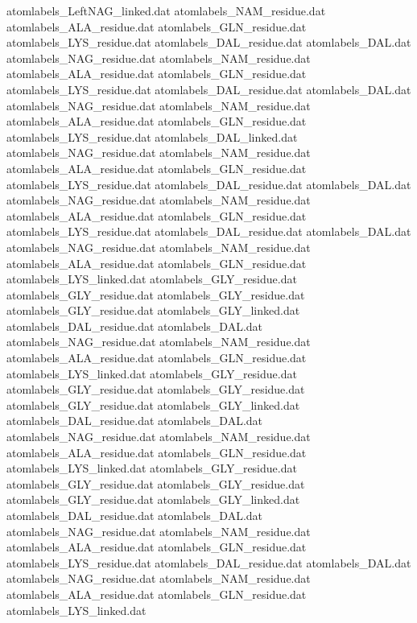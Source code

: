atomlabels_LeftNAG_linked.dat   
atomlabels_NAM_residue.dat      
atomlabels_ALA_residue.dat      
atomlabels_GLN_residue.dat      
atomlabels_LYS_residue.dat      
atomlabels_DAL_residue.dat      
atomlabels_DAL.dat              
atomlabels_NAG_residue.dat      
atomlabels_NAM_residue.dat      
atomlabels_ALA_residue.dat      
atomlabels_GLN_residue.dat      
atomlabels_LYS_residue.dat      
atomlabels_DAL_residue.dat      
atomlabels_DAL.dat              
atomlabels_NAG_residue.dat      
atomlabels_NAM_residue.dat      
atomlabels_ALA_residue.dat      
atomlabels_GLN_residue.dat      
atomlabels_LYS_residue.dat      
atomlabels_DAL_linked.dat       
atomlabels_NAG_residue.dat      
atomlabels_NAM_residue.dat      
atomlabels_ALA_residue.dat      
atomlabels_GLN_residue.dat      
atomlabels_LYS_residue.dat      
atomlabels_DAL_residue.dat      
atomlabels_DAL.dat              
atomlabels_NAG_residue.dat      
atomlabels_NAM_residue.dat      
atomlabels_ALA_residue.dat      
atomlabels_GLN_residue.dat      
atomlabels_LYS_residue.dat      
atomlabels_DAL_residue.dat      
atomlabels_DAL.dat              
atomlabels_NAG_residue.dat      
atomlabels_NAM_residue.dat      
atomlabels_ALA_residue.dat      
atomlabels_GLN_residue.dat      
atomlabels_LYS_linked.dat       
atomlabels_GLY_residue.dat
atomlabels_GLY_residue.dat
atomlabels_GLY_residue.dat
atomlabels_GLY_residue.dat
atomlabels_GLY_linked.dat
atomlabels_DAL_residue.dat      
atomlabels_DAL.dat              
atomlabels_NAG_residue.dat      
atomlabels_NAM_residue.dat      
atomlabels_ALA_residue.dat      
atomlabels_GLN_residue.dat      
atomlabels_LYS_linked.dat       
atomlabels_GLY_residue.dat
atomlabels_GLY_residue.dat
atomlabels_GLY_residue.dat
atomlabels_GLY_residue.dat
atomlabels_GLY_linked.dat
atomlabels_DAL_residue.dat      
atomlabels_DAL.dat              
atomlabels_NAG_residue.dat      
atomlabels_NAM_residue.dat      
atomlabels_ALA_residue.dat      
atomlabels_GLN_residue.dat      
atomlabels_LYS_linked.dat       
atomlabels_GLY_residue.dat
atomlabels_GLY_residue.dat
atomlabels_GLY_residue.dat
atomlabels_GLY_residue.dat
atomlabels_GLY_linked.dat
atomlabels_DAL_residue.dat      
atomlabels_DAL.dat              
atomlabels_NAG_residue.dat      
atomlabels_NAM_residue.dat      
atomlabels_ALA_residue.dat      
atomlabels_GLN_residue.dat      
atomlabels_LYS_residue.dat      
atomlabels_DAL_residue.dat      
atomlabels_DAL.dat              
atomlabels_NAG_residue.dat      
atomlabels_NAM_residue.dat      
atomlabels_ALA_residue.dat      
atomlabels_GLN_residue.dat      
atomlabels_LYS_linked.dat       
